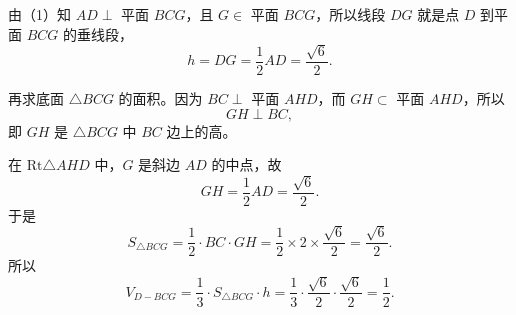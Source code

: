 \begin{answer}

由（1）知 $AD\perp$ 平面 $BCG$，且 $G\in$ 平面 $BCG$，所以线段 $DG$ 就是点 $D$ 到平面 $BCG$ 的垂线段，
\nopagebreak[4]
\[h=DG=\frac12AD=\frac{\sqrt6}2.\]

再求底面 $\triangle BCG$ 的面积。因为 $BC\perp$ 平面 $AHD$，而 $GH\subset$ 平面 $AHD$，所以
\nopagebreak[4]
\[GH\perp BC,\]
即 $GH$ 是 $\triangle BCG$ 中 $BC$ 边上的高。

在 $\mathrm{Rt}\triangle AHD$ 中，$G$ 是斜边 $AD$ 的中点，故
\nopagebreak[4]
\[GH=\frac12AD=\frac{\sqrt6}2.\]
于是
\nopagebreak[4]
\[S_{\triangle BCG}=\frac12\cdot BC\cdot GH=\frac12\times2\times\frac{\sqrt6}2=\frac{\sqrt6}2.\]
所以
\nopagebreak[4]
\[V_{D-BCG}=\frac13\cdot S_{\triangle BCG}\cdot h
=\frac13\cdot\frac{\sqrt6}2\cdot\frac{\sqrt6}2=\frac12.\]



\end{answer}
